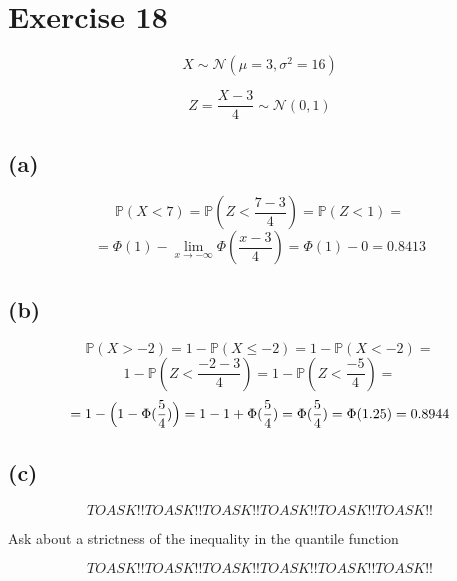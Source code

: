 \documentclass{article}
\begin{document}
\section*{Exercise 18}

\begin{equation*}
    X \sim \mathcal{N}(\mu = 3, \sigma^2 = 16)
\end{equation*}

\begin{equation*}
    Z = \frac{X - 3}{4} \sim \mathcal{N}(0, 1)
\end{equation*}

\subsection*{(a)}

\begin{equation*}
    \mathds{P}(X < 7) = \mathds{P}(Z < \frac{7 - 3}{4}) =  \mathds{P}(Z < 1) = 
\end{equation*}
\begin{equation*}
    = \Phi(1) - \lim_{x \to -\infty}\Phi(\frac{x - 3}{4}) = \Phi(1) - 0 = 0.8413
\end{equation*}


\subsection*{(b)}

\begin{equation*}
    \mathds{P}(X > -2) = 1 - \mathds{P}(X \leq -2) = 1 - \mathds{P}(X < -2) = 
\end{equation*}
\begin{equation*}
    1 - \mathds{P}(Z < \frac{-2 - 3}{4}) = 1 - \mathds{P}(Z < \frac{-5}{4}) = 
\end{equation*}
\begin{equation*}
   = 1 - \Bigl(1 - \Phi(\frac{5}{4})\Bigr) = 1 - 1 + \Phi(\frac{5}{4}) = \Phi(\frac{5}{4}) = \Phi(1.25) = 0.8944
\end{equation*}

\subsection*{(c)}


\begin{equation*}
    TOASK!!TOASK!!TOASK!!TOASK!!TOASK!!TOASK!!
\end{equation*}
\begin{center}
    Ask about a strictness of the inequality in the quantile function 
\end{center}
\begin{equation*}
    TOASK!!TOASK!!TOASK!!TOASK!!TOASK!!TOASK!!
\end{equation*}
\end{document}
